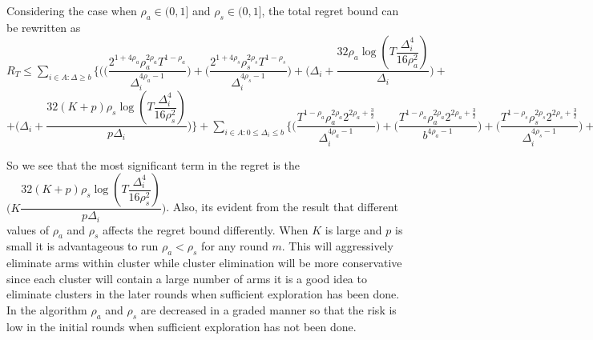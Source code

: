 \begin{remark}
Considering the case when $\rho_{a}\in (0,1]$ and $\rho_{s}\in (0,1]$, the total regret bound can be rewritten as
\newline $R_{T}\leq \sum_{i\in A:\Delta\geq b} \bigg\lbrace \bigg(\bigg(\dfrac{2^{1+4\rho_{a}}\rho_{a}^{2\rho_{a}}T^{1-\rho_{a}}}{\Delta_{i}^{4\rho_{a}-1}}\bigg) + \bigg(\dfrac{2^{1+4\rho_{s}}\rho_{s}^{2\rho_{s}}T^{1-\rho_{s}}}{\Delta_{i}^{4\rho_{s}-1}}\bigg) + \bigg(\Delta_{i}+\dfrac{32\rho_{a}\log{(T\dfrac{\Delta_{i}^{4}}{16\rho_{a}^{2}})}}{\Delta_{i}}\bigg) +$ \newline $ + \bigg(\Delta_{i}+\dfrac{32(K+p)\rho_{s}\log{(T\dfrac{\Delta_{i}^{4}}{16\rho_{s}^{2}})}}{p\Delta_{i}}\bigg)\bigg\rbrace + \sum_{i\in A:0\leq\Delta_{i}\leq b}\bigg\lbrace \bigg(\dfrac{T^{1-\rho_{a}}\rho_{a}^{2\rho_{a}}2^{2\rho_{a}+\frac{3}{2}}}{\Delta_{i}^{4\rho_{a}-1}} \bigg)+\bigg(\dfrac{T^{1-\rho_{a}}\rho_{a}^{2\rho_{a}}2^{2\rho_{a}+\frac{3}{2}}}{b^{4\rho_{a} -1}} \bigg) +  \bigg(\dfrac{T^{1-\rho_{s}}\rho_{s}^{2\rho_{s}}2^{2\rho_{s}+\frac{3}{2}}}{\Delta_{i}^{4\rho_{s}-1}} \bigg)+\bigg(\dfrac{T^{1-\rho_{s}}\rho_{s}^{2\rho_{s}}2^{2\rho_{s}+\frac{3}{2}}}{b^{4\rho_{s} -1}} \bigg) \bigg\rbrace + max_{i:\Delta\leq b}\Delta_{i}T   $

	So we see that the most significant term in the regret is the $\bigg(K\dfrac{32(K+p)\rho_{s}\log{(T\dfrac{\Delta_{i}^{4}}{16\rho_{s}^{2}})}}{p\Delta_{i}}\bigg)$. Also, its evident from the result that different values of $\rho_{a}$ and $\rho_{s}$ affects the regret bound differently. When $K$ is large and $p$ is small it is advantageous to run $\rho_{a}< \rho_{s}$ for any round $m$. This will aggressively eliminate arms within cluster while cluster elimination will be more conservative since each cluster will contain a large number of arms it is a good idea to eliminate clusters in the later rounds when sufficient exploration has been done. In the algorithm $\rho_{a}$ and $\rho_{s}$ are decreased in a graded manner so that the risk is low in the initial rounds when sufficient exploration has not been done.
	
\end{remark}

